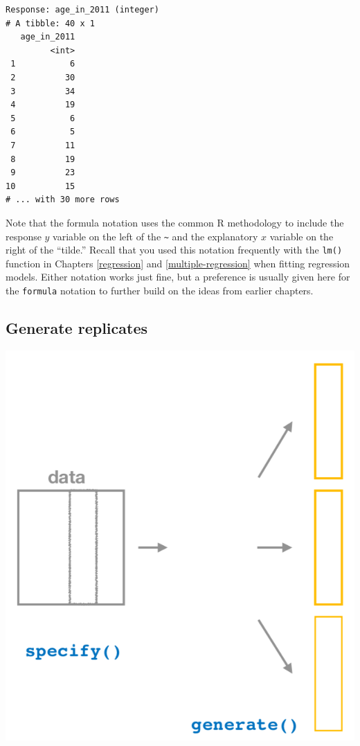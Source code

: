 \documentclass[12pt, krantz2,]{krantz}
\begin{document}
\begin{verbatim}
Response: age_in_2011 (integer)
# A tibble: 40 x 1
   age_in_2011
         <int>
 1           6
 2          30
 3          34
 4          19
 5           6
 6           5
 7          11
 8          19
 9          23
10          15
# ... with 30 more rows
\end{verbatim}

Note that the formula notation uses the common R methodology to include the response \(y\) variable on the left of the \texttt{\textasciitilde{}} and the explanatory \(x\) variable on the right of the ``tilde.'' Recall that you used this notation frequently with the \texttt{lm()} function in Chapters \ref{regression} and \ref{multiple-regression} when fitting regression models. Either notation works just fine, but a preference is usually given here for the \texttt{formula} notation to further build on the ideas from earlier chapters.

\hypertarget{generate-replicates}{%
\subsection{Generate replicates}\label{generate-replicates}}

\begin{center}\includegraphics[width=\textwidth]{images/flowcharts/infer/generate} \end{center}
\end{document}
